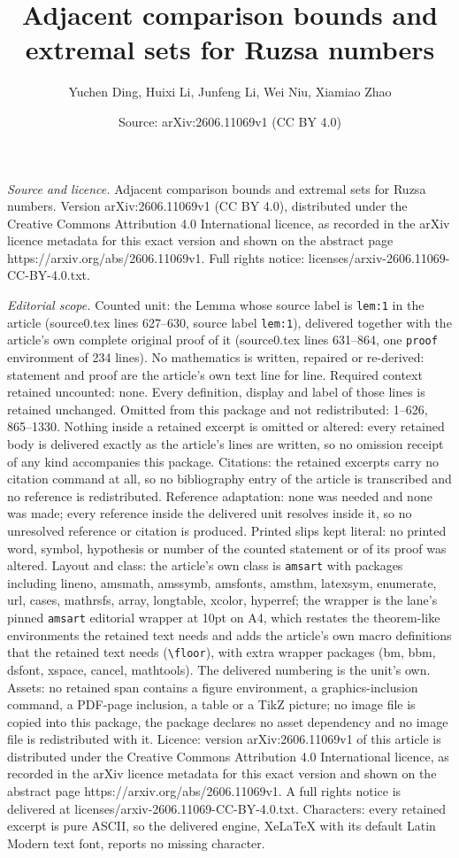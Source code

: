 \documentclass[10pt,a4paper]{amsart}
\title[Adjacent comparison bounds and extremal sets for Ruzsa numbe]{Adjacent comparison bounds and extremal sets for Ruzsa numbers}
\author{Yuchen Ding, Huixi Li, Junfeng Li, Wei Niu, Xiamiao Zhao}
\date{Source: arXiv:2606.11069v1 (CC BY 4.0)}
\begin{document}
\maketitle

\noindent\emph{Source and licence.} Adjacent comparison bounds and extremal sets for Ruzsa numbers. Version arXiv:2606.11069v1 (CC BY 4.0), distributed under the Creative Commons Attribution 4.0 International licence, as recorded in the arXiv licence metadata for this exact version and shown on the abstract page https://arxiv.org/abs/2606.11069v1. Full rights notice: licenses/arxiv-2606.11069-CC-BY-4.0.txt.\par\smallskip

\noindent\textit{Editorial scope.} Counted unit: the Lemma whose source label is \texttt{lem:1} in the article (source0.tex lines 627--630, source label \texttt{lem:1}), delivered together with the article's own complete original proof of it (source0.tex lines 631--864, one \texttt{proof} environment of 234 lines). No mathematics is written, repaired or re-derived: statement and proof are the article's own text line for line. Required context retained uncounted: none. Every definition, display and label of those lines is retained unchanged. Omitted from this package and not redistributed: 1--626, 865--1330. Nothing inside a retained excerpt is omitted or altered: every retained body is delivered exactly as the article's lines are written, so no omission receipt of any kind accompanies this package. Citations: the retained excerpts carry no citation command at all, so no bibliography entry of the article is transcribed and no reference is redistributed. Reference adaptation: none was needed and none was made; every reference inside the delivered unit resolves inside it, so no unresolved reference or citation is produced. Printed slips kept literal: no printed word, symbol, hypothesis or number of the counted statement or of its proof was altered. Layout and class: the article's own class is \texttt{amsart} with packages including lineno, amsmath, amssymb, amsfonts, amsthm, latexsym, enumerate, url, cases, mathrsfs, array, longtable, xcolor, hyperref; the wrapper is the lane's pinned \texttt{amsart} editorial wrapper at 10pt on A4, which restates the theorem-like environments the retained text needs and adds the article's own macro definitions that the retained text needs (\texttt{\textbackslash floor}), with extra wrapper packages (bm, bbm, dsfont, xspace, cancel, mathtools). The delivered numbering is the unit's own. Assets: no retained span contains a figure environment, a graphics-inclusion command, a PDF-page inclusion, a table or a TikZ picture; no image file is copied into this package, the package declares no asset dependency and no image file is redistributed with it. Licence: version arXiv:2606.11069v1 of this article is distributed under the Creative Commons Attribution 4.0 International licence, as recorded in the arXiv licence metadata for this exact version and shown on the abstract page https://arxiv.org/abs/2606.11069v1. A full rights notice is delivered at licenses/arxiv-2606.11069-CC-BY-4.0.txt. Characters: every retained excerpt is pure ASCII, so the delivered engine, XeLaTeX with its default Latin Modern text font, reports no missing character.
\end{document}
